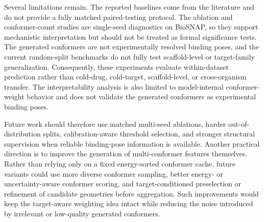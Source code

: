 Several limitations remain. The reported baselines come from the literature and do not provide a fully matched
paired-testing protocol. The ablation and conformer-count studies are single-seed diagnostics on BioSNAP, so
they support mechanistic interpretation but should not be treated as formal significance tests. The generated
conformers are not experimentally resolved binding poses, and the current random-split benchmarks do not
fully test scaffold-level or target-family generalization. Consequently, these experiments evaluate
within-dataset prediction rather than cold-drug, cold-target, scaffold-level, or cross-organism transfer. The
interpretability analysis is also limited to model-internal conformer-weight behavior and does not validate the
generated conformers as experimental binding poses.

Future work should therefore use matched multi-seed ablations, harder out-of-distribution splits,
calibration-aware threshold selection, and stronger structural supervision when reliable binding-pose
information is available. Another practical direction is to improve the generation of multi-conformer
features themselves. Rather than relying only on a fixed energy-sorted conformer cache, future variants could
use more diverse conformer sampling, better energy- or uncertainty-aware conformer scoring, and
target-conditioned preselection or refinement of candidate geometries before aggregation. Such improvements
would keep the target-aware weighting idea intact while reducing the noise introduced by irrelevant or
low-quality generated conformers.
